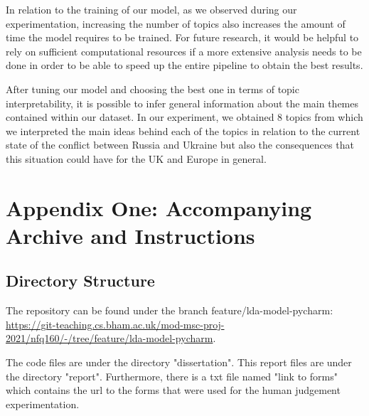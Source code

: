 \documentclass[twoside,12pt,a4paper]{article}
\begin{document}
In relation to the training of our model, as we observed during our experimentation, increasing the number of topics also increases the amount of time the model requires to be trained. For future research, it would be helpful to rely on sufficient computational resources if a more extensive analysis needs to be done in order to be able to speed up the entire pipeline to obtain the best results.

After tuning our model and choosing the best one in terms of topic interpretability, it is possible to infer general information about the main themes contained within our dataset. In our experiment, we obtained 8 topics from which we interpreted the main ideas behind each of the topics in relation to the current state of the conflict between Russia and Ukraine but also the consequences that this situation could have for the UK and Europe in general.

\clearpage
\lhead{}\rhead{}
{}



\clearpage
\section{Appendix One: Accompanying Archive and Instructions}
\label{section:appendix}
\subsection{Directory Structure}
The repository can be found under the branch feature/lda-model-pycharm: \href{https://git-teaching.cs.bham.ac.uk/mod-msc-proj-2021/nfq160/-/tree/feature/lda-model-pycharm}{https://git-teaching.cs.bham.ac.uk/mod-msc-proj-2021/nfq160/-/tree/feature/lda-model-pycharm}.

The code files are under the directory "dissertation". This report files are under the directory "report". Furthermore, there is a txt file named "link to forms" which contains the url to the forms that were used for the human judgement experimentation.

\clearpage
\end{document}
